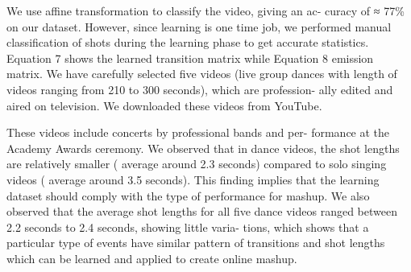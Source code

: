 \documentclass{sig-alternate}
\begin{document}
We use affine transformation to classify the video, giving an ac-
curacy of ≈ 77\% on our dataset. However, since learning is one
time job, we performed manual classification of shots during the
learning phase to get accurate statistics. Equation 7 shows the
learned transition matrix while Equation 8 emission matrix. We
have carefully selected five videos (live group dances with length
of videos ranging from 210 to 300 seconds), which are profession-
ally edited and aired on television. We downloaded these videos
from YouTube.

These videos include concerts by professional bands and per-
formance at the Academy Awards ceremony. We observed that
in dance videos, the shot lengths are relatively smaller ( average
around 2.3 seconds) compared to solo singing videos ( average
around 3.5 seconds). This finding implies that the learning dataset
should comply with the type of performance for mashup. We also
observed that the average shot lengths for all five dance videos
ranged between 2.2 seconds to 2.4 seconds, showing little varia-
tions, which shows that a particular type of events have similar
pattern of transitions and shot lengths which can be learned and
applied to create online mashup.
\end{document}
